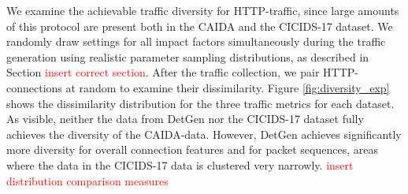 \documentclass[sigconf]{acmart}
\begin{document}
We examine the achievable traffic diversity for HTTP-traffic, since large amounts of this protocol are present both in the CAIDA and the CICIDS-17 dataset.
We randomly draw settings for all impact factors simultaneously during the traffic generation using realistic parameter sampling distributions, as described in Section \textcolor{red}{insert correct section}. After the traffic collection, we pair HTTP-connections at random to examine their dissimilarity. Figure \ref{fig:diversity_exp} shows the dissimilarity distribution for the three traffic metrics for each dataset. As visible, neither the data from DetGen nor the CICIDS-17 dataset fully achieves the diversity of the CAIDA-data. However, DetGen achieves significantly more diversity for overall connection features and for packet sequences, areas where the data in the CICIDS-17 data is clustered very narrowly. \textcolor{red}{insert distribution comparison measures}










\end{document}
